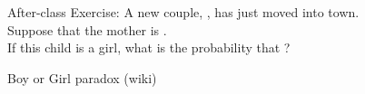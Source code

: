 \begin{frame}{}
  \begin{exampleblock}{After-class Exercise:}
    A new couple, , has just moved into town. \\
    Suppose that the mother is . \\
    If this child is a girl, what is the probability that ?
  \end{exampleblock}

  \vspace{0.50cm}
\end{frame}

\begin{frame}{}

  \vspace{-0.30cm}
  \centerline{Boy or Girl paradox (wiki)}
\end{frame}
